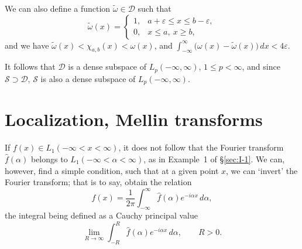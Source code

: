 We can also define a function $\tilde\omega\in\mathcal D$ such that
\begin{equation}\tag{3.13}\label{eq:I-3.13}
\tilde\omega(x)=
\begin{cases}1,&a+\varepsilon\le x\le b-\varepsilon,\\0,&x\le a,\ x\ge b,\end{cases}
\end{equation}
and we have $\tilde\omega(x)<\chi_{a,b}(x)<\omega(x)$, and
$\int_{-\infty}^{\infty}\bigl(\omega(x)-\tilde\omega(x)\bigr)\,dx<4\varepsilon$.

It follows that $\mathcal D$ is a dense subspace of $L_p(-\infty,\infty)$, $1\le p<\infty$, and since $\mathcal S\supset\mathcal D$, $\mathcal S$ is also a dense subspace of $L_p(-\infty,\infty)$.

\section{Localization, Mellin transforms}
\label{sec:I-4}

If $f(x)\in L_1(-\infty<x<\infty)$, it does not follow that the Fourier transform $\hat f(\alpha)$ belongs to $L_1(-\infty<\alpha<\infty)$, as in Example~1 of \S\ref{sec:I-1}. We can, however, find a simple condition, such that at a given point $x$, we can `invert' the Fourier transform; that is to say, obtain the relation
\begin{equation*}
f(x)=\frac{1}{2\pi}\int_{-\infty}^{\infty}\hat f(\alpha)e^{-i\alpha x}\,d\alpha,
\end{equation*}
the integral being defined as a Cauchy principal value
\begin{equation*}
\lim_{R\to\infty}\int_{-R}^{R}\hat f(\alpha)e^{-i\alpha x}\,d\alpha,\qquad R>0.
\end{equation*}

